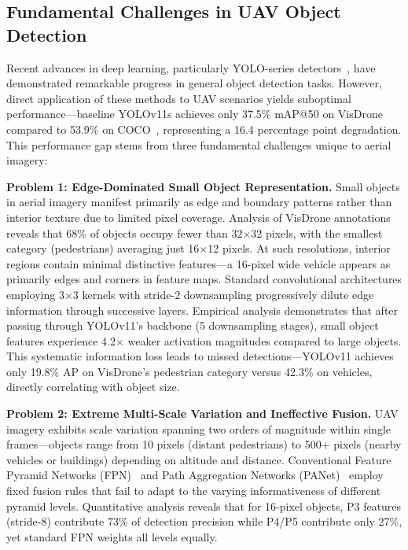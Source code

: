 \documentclass[preprint,12pt]{elsarticle}
\begin{document}
\subsection{Fundamental Challenges in UAV Object Detection}

Recent advances in deep learning, particularly YOLO-series
detectors~\cite{yolov1,yolov4,yolov7,yolov8}, have demonstrated remarkable
progress in general object detection tasks. However, direct application of these
methods to UAV scenarios yields suboptimal performance---baseline YOLOv11s
achieves only 37.5\% mAP@50 on VisDrone compared to 53.9\% on
COCO~\cite{yolov11}, representing a 16.4 percentage point degradation. This
performance gap stems from three fundamental challenges unique to aerial imagery:

\textbf{Problem 1: Edge-Dominated Small Object Representation.} Small objects in
aerial imagery manifest primarily as edge and boundary patterns rather than
interior texture due to limited pixel coverage. Analysis of VisDrone annotations
reveals that 68\% of objects occupy fewer than 32$\times$32 pixels, with the
smallest category (pedestrians) averaging just 16$\times$12 pixels. At such
resolutions, interior regions contain minimal distinctive features---a 16-pixel
wide vehicle appears as primarily edges and corners in feature maps. Standard
convolutional architectures employing 3$\times$3 kernels with stride-2
downsampling progressively dilute edge information through successive layers.
Empirical analysis demonstrates that after passing through YOLOv11's backbone
(5 downsampling stages), small object features experience 4.2$\times$ weaker
activation magnitudes compared to large objects. This systematic information loss
leads to missed detections---YOLOv11 achieves only 19.8\% AP on VisDrone's
pedestrian category versus 42.3\% on vehicles, directly correlating with object
size.

\textbf{Problem 2: Extreme Multi-Scale Variation and Ineffective Fusion.} UAV
imagery exhibits scale variation spanning two orders of magnitude within single
frames---objects range from 10 pixels (distant pedestrians) to 500+ pixels
(nearby vehicles or buildings) depending on altitude and distance. Conventional
Feature Pyramid Networks (FPN)~\cite{fpn} and Path Aggregation Networks
(PANet)~\cite{panet} employ fixed fusion rules that fail to adapt to the varying
informativeness of different pyramid levels. Quantitative analysis reveals that
for 16-pixel objects, P3 features (stride-8) contribute 73\% of detection
precision while P4/P5 contribute only 27\%, yet standard FPN weights all levels
equally.
\end{document}
